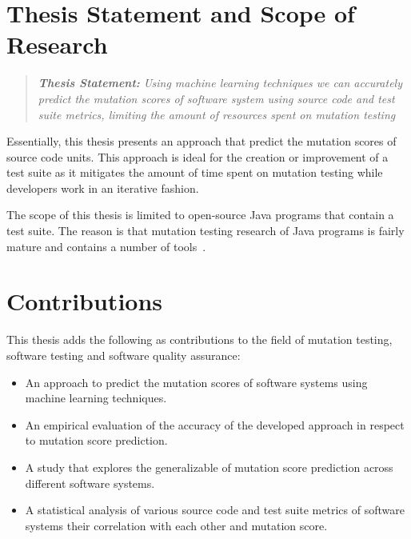 \section{Thesis Statement and Scope of Research}
\label{sec:introduction_statement_and_scope}
\begin{quote}
  \emph{\textbf{Thesis Statement:} Using machine learning techniques we can accurately predict the mutation scores of software system using source code and test suite metrics, limiting the amount of resources spent on mutation testing}
\end{quote}
Essentially, this thesis presents an approach that predict the mutation scores of source code units. This approach is ideal for the creation or improvement of a test suite as it mitigates the amount of time spent on mutation testing while developers work in an iterative fashion.

The scope of this thesis is limited to open-source Java programs that contain a test suite. The reason is that mutation testing research of Java programs is fairly mature and contains a number of tools~\cite{JH10}.


\section{Contributions}
\label{sec:introduction_contributions}
This thesis adds the following as contributions to the field of mutation testing, software testing and software quality assurance:

\begin{itemize}
  \item An approach to predict the mutation scores of software systems using machine learning techniques.
  \item An empirical evaluation of the accuracy of the developed approach in respect to mutation score prediction.
  \item A study that explores the generalizable of mutation score prediction across different software systems.
  \item A statistical analysis of various source code and test suite metrics of software systems their correlation with each other and mutation score.
\end{itemize}


